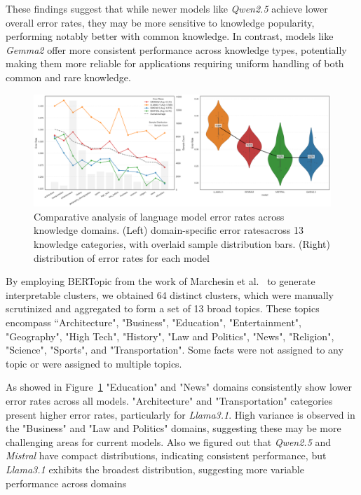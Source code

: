 These findings suggest that while newer models like \textit{Qwen2.5} achieve lower overall error rates, they may be more sensitive to knowledge popularity, performing notably better with common knowledge.
In contrast, models like \textit{Gemma2} offer more consistent performance across knowledge types, potentially making them more reliable for applications requiring uniform handling of both common and rare knowledge.

\begin{figure}[ht!]
    \centering
    \begin{minipage}[b]{\textwidth}
        \centering
        \includegraphics[width=\textwidth]{res/combined-model-analysis}
    \end{minipage}
    \caption{Comparative analysis of language model error rates across knowledge domains. (Left) domain-specific error ratesacross 13 knowledge categories, with overlaid sample distribution bars. (Right) distribution of error rates for each model}
    \label{fig:topic_distribution_analysis}
\end{figure}

By employing BERTopic from the work of Marchesin et al.~\cite{Marchesin_Silvello_Alonso_2024} to generate interpretable clusters, we obtained 64 distinct clusters, which were manually scrutinized and aggregated to form a set of 13 broad topics.
These topics encompass “Architecture", "Business", "Education", "Entertainment", "Geography", "High Tech", "History", "Law and Politics", "News", "Religion", "Science", "Sports", and  "Transportation".
Some facts were not assigned to any topic or were assigned to multiple topics.

As showed in Figure~\ref{fig:topic_distribution_analysis} "Education" and "News" domains consistently show lower error rates across all models.
"Architecture" and "Transportation" categories present higher error rates, particularly for \textit{Llama3.1}.
High variance is observed in the "Business" and "Law and Politics" domains, suggesting these may be more challenging areas for current models.
Also we figured out that \textit{Qwen2.5} and \textit{Mistral} have compact distributions, indicating consistent performance, but \textit{Llama3.1} exhibits the broadest distribution, suggesting more variable performance across domains

